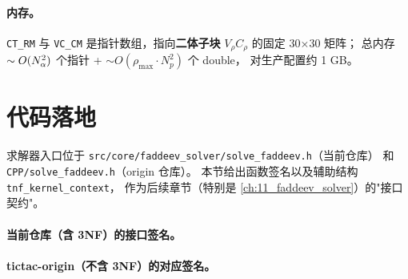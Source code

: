 \paragraph{内存。}
\texttt{CT\_RM} 与 \texttt{VC\_CM} 是指针数组，指向\textbf{二体子块} \(V_{\rho} C_{\rho}\) 的固定 30×30 矩阵；
总内存 \(\sim O(N_\alpha^2)\) 个指针 + \(\sim O(\rho_{\max} \cdot N_p^2)\) 个 double，
对生产配置约 1 GB。

\section{代码落地}
\label{sec:ch04-code}

求解器入口位于 \texttt{src/core/faddeev\_solver/solve\_faddeev.h}（当前仓库）
和 \texttt{CPP/solve\_faddeev.h}（origin 仓库）。
本节给出函数签名以及辅助结构 \texttt{tnf\_kernel\_context}，
作为后续章节（特别是 \cref{ch:11_faddeev_solver}）的"接口契约"。

\paragraph{当前仓库（含 3NF）的接口签名。}


\paragraph{tictac-origin（不含 3NF）的对应签名。}


